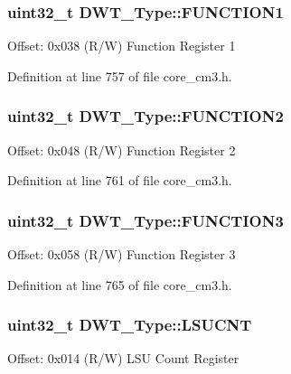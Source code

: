 \subsubsection[{\texorpdfstring{F\+U\+N\+C\+T\+I\+O\+N1}{FUNCTION1}}]{ uint32\+\_\+t D\+W\+T\+\_\+\+Type\+::\+F\+U\+N\+C\+T\+I\+O\+N1}\hypertarget{structDWT__Type_a3345a33476ee58e165447a3212e6d747}{}\label{structDWT__Type_a3345a33476ee58e165447a3212e6d747}
Offset\+: 0x038 (R/W) Function Register 1 

Definition at line 757 of file core\+\_\+cm3.\+h.

\subsubsection[{\texorpdfstring{F\+U\+N\+C\+T\+I\+O\+N2}{FUNCTION2}}]{ uint32\+\_\+t D\+W\+T\+\_\+\+Type\+::\+F\+U\+N\+C\+T\+I\+O\+N2}\hypertarget{structDWT__Type_acba1654190641a3617fcc558b5e3f87b}{}\label{structDWT__Type_acba1654190641a3617fcc558b5e3f87b}
Offset\+: 0x048 (R/W) Function Register 2 

Definition at line 761 of file core\+\_\+cm3.\+h.

\subsubsection[{\texorpdfstring{F\+U\+N\+C\+T\+I\+O\+N3}{FUNCTION3}}]{ uint32\+\_\+t D\+W\+T\+\_\+\+Type\+::\+F\+U\+N\+C\+T\+I\+O\+N3}\hypertarget{structDWT__Type_a80bd242fc05ca80f9db681ce4d82e890}{}\label{structDWT__Type_a80bd242fc05ca80f9db681ce4d82e890}
Offset\+: 0x058 (R/W) Function Register 3 

Definition at line 765 of file core\+\_\+cm3.\+h.

\subsubsection[{\texorpdfstring{L\+S\+U\+C\+NT}{LSUCNT}}]{ uint32\+\_\+t D\+W\+T\+\_\+\+Type\+::\+L\+S\+U\+C\+NT}\hypertarget{structDWT__Type_aeba92e6c7fd3de4ba06bfd94f47f5b35}{}\label{structDWT__Type_aeba92e6c7fd3de4ba06bfd94f47f5b35}
Offset\+: 0x014 (R/W) L\+SU Count Register 

